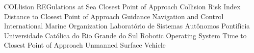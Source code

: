 \begin{acronym}
  {COLlision REGulations at Sea}
      {Closest Point of Approach}
      {Collision Risk Index}
     {Distance to Closest Point of Approach}
      {Guidance Navigation and Control}
      {International Marine Organization}
      {Laboratório de Sistemas Autônomos}
    {Pontifícia Universidade Católica do Rio Grande do Sul}
      {Robotic Operating System}
     {Time to Closest Point of Approach}
      {Unmanned Surface Vehicle}
\end{acronym}